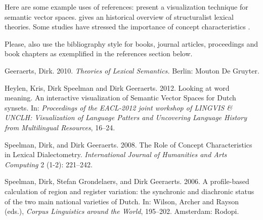 \documentclass[11pt,a4paper]{article}
\begin{document}
Here are some example uses of references: \citet{HeylenSpeelmanGeeraerts2012} present a visualization technique for semantic vector spaces. \citet[p.~47-100]{geeraerts10theories} gives an historical overview of structuralist lexical theories. Some studies have stressed the importance of concept characteristics \citep{speelman09concept,SpeelmanGrondelaersGeeraerts2010}.

Please, also use the bibliography style for books, journal articles, proceedings and book chapters as exemplified in the references section below.    


\begin{thebibliography}{00}

Geeraerts, Dirk. 2010. {\em Theories of Lexical Semantics.} Berlin: Mouton De Gruyter.


Heylen, Kris, Dirk Speelman and Dirk Geeraerts. 2012. Looking at word meaning. An interactive visualization of Semantic Vector Spaces for Dutch synsets. In: {\em Proceedings of the EACL-2012 joint workshop of LINGVIS \& UNCLH: Visualization of Language Patters and Uncovering Language History from Multilingual Resources}, 16--24.
  


Speelman, Dirk, and Dirk Geeraerts. 2008. The Role of Concept Characteristics in Lexical Dialectometry. {\em International Journal of Humanities and Arts Computing} 2 (1-2): 221--242.

Speelman, Dirk, Stefan Grondelaers,  and Dirk Geeraerts. 2006. A profile-based calculation of region and register variation: the synchronic and diachronic status of the two main national varieties of Dutch. In: Wilson, Archer and Rayson (eds.), {\em Corpus Linguistics around the World}, 195--202. Amsterdam: Rodopi.

\end{thebibliography}
\end{document}
